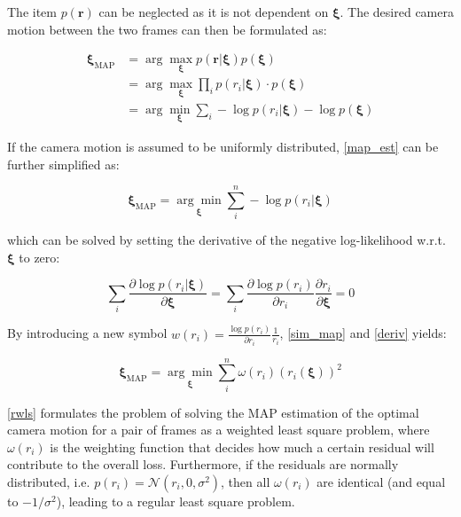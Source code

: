 \documentclass[acmsmall, nonacm, 11pt]{acmart}
\begin{document}
The item $p(\mathbf{r})$ can be neglected as it is not dependent on $\boldsymbol{\xi}$. The desired camera motion between the two frames can then be formulated as:

\begin{equation}
\begin{aligned}
\boldsymbol{\xi}_{\mathrm{MAP}} &= \arg \max _{\boldsymbol{\xi}} p(\mathbf{r} | \boldsymbol{\xi}) p(\boldsymbol{\xi}) \\
&=\arg \max _{\boldsymbol{\xi}} \prod_{i} p\left(r_{i} | \boldsymbol{\xi}\right) \cdot p(\boldsymbol{\xi}) \\
&=\arg \min _{\boldsymbol{\xi}} \sum_{i} -\log p\left(r_{i} | \boldsymbol{\xi}\right) - \log p(\boldsymbol{\xi})
\end{aligned}
\label{map_est}
\end{equation}

If the camera motion is assumed to be uniformly distributed, \eqref{map_est} can be further simplified as:

\begin{equation}
\boldsymbol{\xi}_{\mathrm{MAP}}=\underset{\boldsymbol{\xi}}{\arg \min } \sum_{i}^{n} -\log p\left(r_{i} | \boldsymbol{\xi}\right)
\label{sim_map}
\end{equation}

\noindent which can be solved by setting the derivative of the negative log-likelihood w.r.t. $\boldsymbol{\xi}$ to zero:

\begin{equation}
\sum_{i} \frac{\partial \log p\left(r_{i} | \boldsymbol{\xi}\right)}{\partial \boldsymbol{\xi}}=\sum_{i} \frac{\partial \log p\left(r_{i}\right)}{\partial r_{i}} \frac{\partial r_{i}}{\partial \boldsymbol{\xi}}=0
\label{deriv}
\end{equation}

By introducing a new symbol $w\left(r_{i}\right)=\frac{\log p\left(r_{i}\right)}{\partial r_{i}} \frac{1}{r_{i}}$, \eqref{sim_map} and \eqref{deriv} yields:

\begin{equation}
\boldsymbol{\xi}_{\mathrm{MAP}}=\underset{\boldsymbol{\xi}}{\arg \min } \sum_{i}^{n}\omega(r_i)(r_{i}(\boldsymbol{\xi}))^{2}
\label{rwls}
\end{equation}

\eqref{rwls} formulates the problem of solving the MAP estimation of the optimal camera motion for a pair of frames as a weighted least square problem, where $\omega(r_i)$ is the weighting function that decides how much a certain residual will contribute to the overall loss. Furthermore, if the residuals are normally distributed, i.e. $p\left(r_{i}\right)= \mathcal{N}\left(r_i, 0, \sigma^2\right)$, then all $\omega(r_i)$ are identical (and equal to $-1 /\sigma^2$), leading to a regular least square problem.
\end{document}
